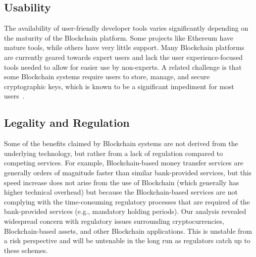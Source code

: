 \subsection{Usability} %
The availability of user-friendly developer tools varies significantly 
depending on the maturity of the Blockchain platform. Some projects like 
Ethereum have mature tools, while others have very little support. Many 
Blockchain platforms are currently geared towards expert users and lack the 
user experience-focused tools needed to allow for easier use by non-experts.
A related challenge is that some Blockchain systems require users to store, 
manage, and secure cryptographic keys, which is known to be a significant 
impediment for most users~\cite{ruoti2019usability}.


\subsection{Legality and Regulation}
Some of the benefits claimed by Blockchain systems are not derived from the 
underlying technology, but rather from a lack of regulation compared to 
competing services. 
For example, Blockchain-based money transfer services are generally orders of 
magnitude faster than similar bank-provided services, but this speed increase 
does not arise from the use of Blockchain (which generally has higher technical 
overhead) but because the Blockchain-based services are not complying with the 
time-consuming regulatory processes that are required of the bank-provided services (e.g., 
mandatory holding periods).
Our analysis revealed widespread concern with regulatory issues surrounding 
cryptocurrencies, Blockchain-based assets, and other Blockchain applications. 
This is unstable from a risk perspective and will be untenable in the long run 
as regulators catch up to these schemes.

